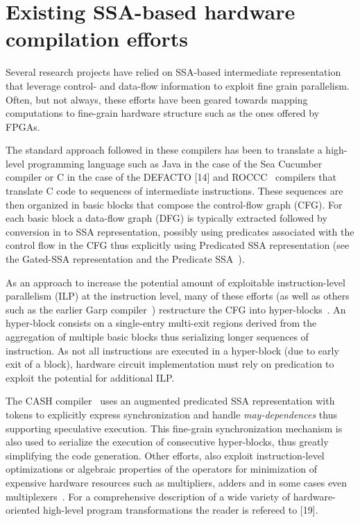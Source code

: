 \section{Existing SSA-based hardware compilation efforts}
Several research projects have relied on SSA-based intermediate representation 
that leverage control- and data-flow information to exploit fine grain parallelism. 
Often, but not always, these efforts have been geared towards mapping computations 
to fine-grain hardware structure such as the ones offered by FPGAs.

The standard approach followed in these compilers has been to translate a high-level programming language such as Java in the case of the Sea Cucumber~\cite{Tripp:FPL02} compiler or C in the case of the DEFACTO [14] and ROCCC~\cite{Najjar:ROCCC08} compilers that translate C code to sequences of intermediate instructions. These sequences are then organized in basic blocks that compose the control-flow graph (CFG). For each basic block a data-flow graph (DFG) is typically extracted followed by conversion in to SSA representation, possibly using predicates associated with the control flow in the CFG thus explicitly using Predicated SSA representation (see the Gated-SSA representation\cite{Tu-SC95} and the Predicate SSA~\cite{Carter:PACT99,deFerriere:SCOPES07,Stoutchinin:2001:MICRO}).


As an approach to increase the potential amount of exploitable instruction-level parallelism (ILP) at the instruction level, many of these efforts (as well as others such as the earlier Garp compiler~\cite{Callahan:Computer00}) restructure the CFG into hyper-blocks~\cite{Mahlke:Micro92}.  An hyper-block consists on a single-entry multi-exit regions derived from the aggregation of multiple basic blocks thus serializing longer sequences of instruction. 
As not all instructions are executed in a hyper-block (due to early exit of a block), hardware circuit implementation must rely on predication to exploit the potential for additional ILP. 

The CASH compiler~\cite{Budiu:FPL02} uses an augmented predicated SSA representation with tokens to explicitly express synchronization and handle {\em may-dependences} thus supporting speculative execution.  This fine-grain synchronization mechanism is also used to serialize the execution of consecutive hyper-blocks, thus greatly simplifying the code generation. Other efforts, also exploit instruction-level optimizations or algebraic properties of the operators for minimization of expensive hardware resources such as multipliers, adders and in some cases even multiplexers~\cite{Verma08,Nancekievill05}. For a comprehensive description of a wide variety of hardware-oriented high-level program transformations the reader is refereed to [19].

